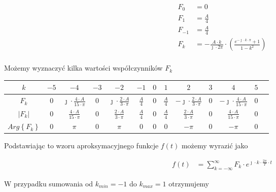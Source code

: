 \begin{task}
\begin{align*}
F_0&=0\\
F_1&=\frac{A}{4}\\
F_{-1}&=\frac{A}{4}\\
F_k&=-\frac{A \cdot k}{\jmath \cdot 2\pi} \cdot \left( \frac{ e^{-\jmath \cdot k \cdot \pi}  + 1}{1 -k^2} \right)\\
\end{align*}

Możemy wyznaczyć kilka wartości współczynników $F_k$

\begin{table}[H]
  \centering  
  \begin{tabular}{|c|c|c|c|c|c|c|c|c|c|c|c|c|}
    \hline 
    $k$ & $-5$ & $-4$ & $-3$ & $-2$ & $-1$ & $0$ & $1$ & $2$ & $3$ & $4$ & $5$\\ 
    \hline 
    $F_k$ & $0$ & $\jmath \cdot \frac{4\cdot A}{15 \cdot \pi}$ & $0$ & $\jmath \cdot \frac{2\cdot A}{3 \cdot \pi}$  & $\frac{A}{4}$ & $0$ & $\frac{A}{4}$ &  $-\jmath \cdot \frac{2\cdot A}{3 \cdot \pi}$ & $0$ & $-\jmath \cdot \frac{4\cdot A}{15 \cdot \pi}$ & $0$\\ 
    \hline 
    $\left| F_k \right|$ & $0$ & $\frac{4\cdot A}{15 \cdot \pi}$ & $0$ & $\frac{2\cdot A}{3 \cdot \pi}$ & $\frac{A}{4}$ & $0$ & $\frac{A}{4}$ & $\frac{2\cdot A}{3 \cdot \pi}$ & $0$ & $\frac{4\cdot A}{15 \cdot \pi}$ & $0$\\
    \hline
    $Arg\left\{ F_k \right\}$ & $0$ & $\pi$ & $0$ & $\pi$ & $0$ & $0$ & $0$ & $-\pi$ & $0$ & $-\pi$ & $0$\\
    \hline
  \end{tabular} 
\end{table}

Podstawiając to wzoru aproksymacyjnego funkcje $f(t)$ możemy wyrazić jako

\begin{equation}
\begin{aligned}
f(t) &= \sum_{k=-\infty}^{\infty} F_k \cdot e^{\jmath \cdot k \cdot \frac{2\pi}{T} \cdot t}
\end{aligned}
\end{equation}

W przypadku sumowania od $k_{min}=-1$ do $k_{max}=1$ otrzymujemy 

\begin{figure}[H]
  \centering
\end{figure}
\end{task}
